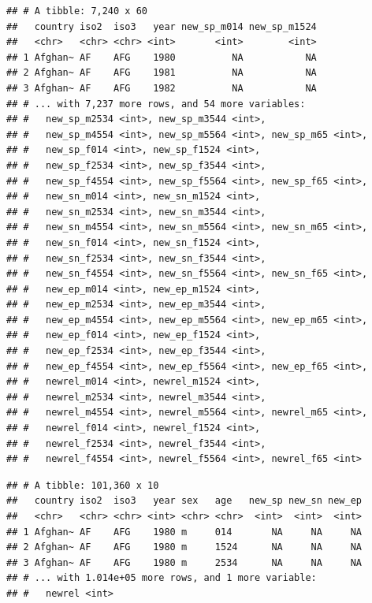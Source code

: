 \documentclass[]{book}
\newenvironment{Shaded}{}{}
\newcommand{\DataTypeTok}[1]{#1}
\newcommand{\KeywordTok}[1]{\textcolor[rgb]{0.00,0.00,1.00}{#1}}
\newcommand{\NormalTok}[1]{#1}
\newcommand{\OperatorTok}[1]{#1}
\newcommand{\StringTok}[1]{\textcolor[rgb]{0.00,0.50,0.50}{#1}}
\begin{document}
\begin{verbatim}
## # A tibble: 7,240 x 60
##   country iso2  iso3   year new_sp_m014 new_sp_m1524
##   <chr>   <chr> <chr> <int>       <int>        <int>
## 1 Afghan~ AF    AFG    1980          NA           NA
## 2 Afghan~ AF    AFG    1981          NA           NA
## 3 Afghan~ AF    AFG    1982          NA           NA
## # ... with 7,237 more rows, and 54 more variables:
## #   new_sp_m2534 <int>, new_sp_m3544 <int>,
## #   new_sp_m4554 <int>, new_sp_m5564 <int>, new_sp_m65 <int>,
## #   new_sp_f014 <int>, new_sp_f1524 <int>,
## #   new_sp_f2534 <int>, new_sp_f3544 <int>,
## #   new_sp_f4554 <int>, new_sp_f5564 <int>, new_sp_f65 <int>,
## #   new_sn_m014 <int>, new_sn_m1524 <int>,
## #   new_sn_m2534 <int>, new_sn_m3544 <int>,
## #   new_sn_m4554 <int>, new_sn_m5564 <int>, new_sn_m65 <int>,
## #   new_sn_f014 <int>, new_sn_f1524 <int>,
## #   new_sn_f2534 <int>, new_sn_f3544 <int>,
## #   new_sn_f4554 <int>, new_sn_f5564 <int>, new_sn_f65 <int>,
## #   new_ep_m014 <int>, new_ep_m1524 <int>,
## #   new_ep_m2534 <int>, new_ep_m3544 <int>,
## #   new_ep_m4554 <int>, new_ep_m5564 <int>, new_ep_m65 <int>,
## #   new_ep_f014 <int>, new_ep_f1524 <int>,
## #   new_ep_f2534 <int>, new_ep_f3544 <int>,
## #   new_ep_f4554 <int>, new_ep_f5564 <int>, new_ep_f65 <int>,
## #   newrel_m014 <int>, newrel_m1524 <int>,
## #   newrel_m2534 <int>, newrel_m3544 <int>,
## #   newrel_m4554 <int>, newrel_m5564 <int>, newrel_m65 <int>,
## #   newrel_f014 <int>, newrel_f1524 <int>,
## #   newrel_f2534 <int>, newrel_f3544 <int>,
## #   newrel_f4554 <int>, newrel_f5564 <int>, newrel_f65 <int>
\end{verbatim}

\begin{Shaded}
\end{Shaded}

\begin{verbatim}
## # A tibble: 101,360 x 10
##   country iso2  iso3   year sex   age   new_sp new_sn new_ep
##   <chr>   <chr> <chr> <int> <chr> <chr>  <int>  <int>  <int>
## 1 Afghan~ AF    AFG    1980 m     014       NA     NA     NA
## 2 Afghan~ AF    AFG    1980 m     1524      NA     NA     NA
## 3 Afghan~ AF    AFG    1980 m     2534      NA     NA     NA
## # ... with 1.014e+05 more rows, and 1 more variable:
## #   newrel <int>
\end{verbatim}
\end{document}
